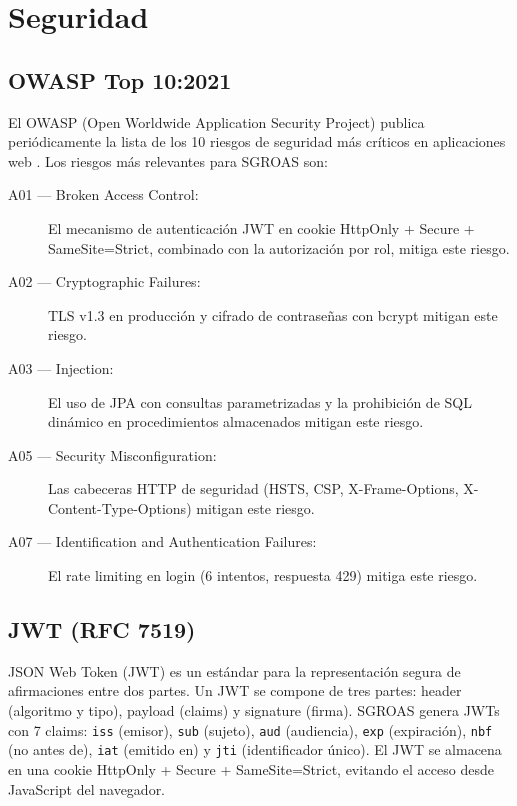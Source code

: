\section{Seguridad}
\label{sec:security-theory}

\subsection{OWASP Top 10:2021}
\label{sec:owasp}

El OWASP (Open Worldwide Application Security Project) publica periódicamente la lista de los 10 riesgos de seguridad más críticos en aplicaciones web \cite{owasp}. Los riesgos más relevantes para SGROAS son:

\begin{description}
  \item[A01 — Broken Access Control:] El mecanismo de autenticación JWT en cookie HttpOnly + Secure + SameSite=Strict, combinado con la autorización por rol, mitiga este riesgo.
  \item[A02 — Cryptographic Failures:] TLS v1.3 en producción y cifrado de contraseñas con bcrypt mitigan este riesgo.
  \item[A03 — Injection:] El uso de JPA con consultas parametrizadas y la prohibición de SQL dinámico en procedimientos almacenados mitigan este riesgo.
  \item[A05 — Security Misconfiguration:] Las cabeceras HTTP de seguridad (HSTS, CSP, X-Frame-Options, X-Content-Type-Options) mitigan este riesgo.
  \item[A07 — Identification and Authentication Failures:] El rate limiting en login (6 intentos, respuesta 429) mitiga este riesgo.
\end{description}

\subsection{JWT (RFC 7519)}
\label{sec:jwt}

JSON Web Token (JWT) \cite{rfc7519} es un estándar para la representación segura de afirmaciones entre dos partes. Un JWT se compone de tres partes: header (algoritmo y tipo), payload (claims) y signature (firma). SGROAS genera JWTs con 7 claims: \texttt{iss} (emisor), \texttt{sub} (sujeto), \texttt{aud} (audiencia), \texttt{exp} (expiración), \texttt{nbf} (no antes de), \texttt{iat} (emitido en) y \texttt{jti} (identificador único). El JWT se almacena en una cookie HttpOnly + Secure + SameSite=Strict, evitando el acceso desde JavaScript del navegador.

